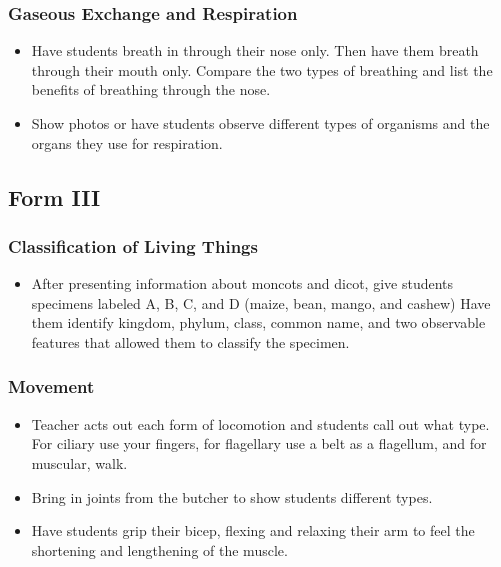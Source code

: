 \subsubsection{Gaseous Exchange and Respiration}
\begin{itemize}
\item Have students breath in through their nose only.  Then have them breath through their mouth only.  Compare the two types of breathing and list the benefits of breathing through the nose.
\item Show photos or have students observe different types of organisms and the organs they use for respiration.
\end{itemize}

\subsection{Form III}
\subsubsection{Classification of Living Things}
\begin{itemize}
\item After presenting information about moncots and dicot, give students specimens labeled A, B, C, and D (maize, bean, mango, and cashew) Have them identify kingdom, phylum, class, common name, and two observable features that allowed them to classify the specimen.
\end{itemize}

\subsubsection{Movement}
\begin{itemize}
\item Teacher acts out each form of locomotion and students call out what type. For ciliary use your fingers, for flagellary use a belt as a flagellum, and for muscular, walk.
\item Bring in joints from the butcher to show students different types.
\item Have students grip their bicep, flexing and relaxing their arm to feel the shortening and lengthening of the muscle.
\end{itemize}

